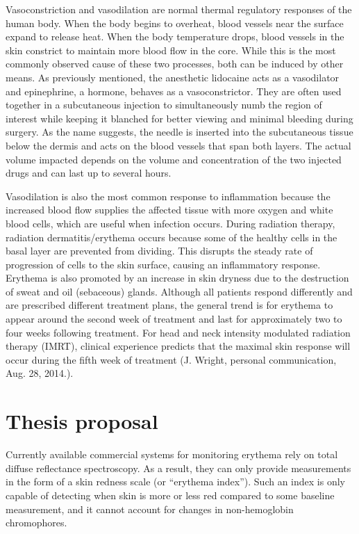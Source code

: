Vasoconstriction and vasodilation are normal thermal regulatory responses of the human body.\cite{Kellogg2012} When the body begins to overheat, blood vessels near the surface expand to release heat. When the body temperature drops, blood vessels in the skin constrict to maintain more blood flow in the core. While this is the most commonly observed cause of these two processes, both can be induced by other means. As previously mentioned, the anesthetic lidocaine acts as a vasodilator and epinephrine, a hormone, behaves as a vasoconstrictor. They are often used together in a subcutaneous injection to simultaneously numb the region of interest while keeping it blanched for better viewing and minimal bleeding during surgery. As the name suggests, the needle is inserted into the subcutaneous tissue below the dermis and acts on the blood vessels that span both layers. The actual volume impacted depends on the volume and concentration of the two injected drugs and can last up to several hours.

Vasodilation is also the most common response to inflammation because the increased blood flow supplies the affected tissue with more oxygen and white blood cells, which are useful when infection occurs. During radiation therapy, radiation dermatitis/erythema occurs because some of the healthy cells in the basal layer are prevented from dividing.\cite{Fitzgerald2008} This disrupts the steady rate of progression of cells to the skin surface, causing an inflammatory response.\cite{Simonen1998} Erythema is also promoted by an increase in skin dryness due to the destruction of sweat and oil (sebaceous) glands. Although all patients respond differently and are prescribed different treatment plans, the general trend is for erythema to appear around the second week of treatment and last for approximately two to four weeks following treatment. For head and neck intensity modulated radiation therapy (IMRT), clinical experience predicts that the maximal skin response will occur during the fifth week of treatment (J. Wright, personal communication, Aug. 28, 2014.).

\section{Thesis proposal}
Currently available commercial systems for monitoring erythema rely on total diffuse reflectance spectroscopy.\cite{Clarys2000} As a result, they can only provide measurements in the form of a skin redness scale (or ``erythema index''). Such an index is only capable of detecting when skin is more or less red compared to some baseline measurement, and it cannot account for changes in non-hemoglobin chromophores.

